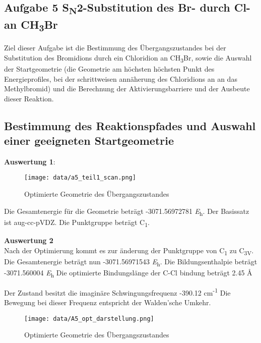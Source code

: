 \documentclass[12pt]{article}
\begin{document}
\begin{onehalfspace}

\raggedright
\section{Aufgabe 5 S\textsubscript{N}2-Substitution des Br- durch Cl- an CH\textsubscript{3}Br}

Ziel dieser Aufgabe ist die Bestimmung des Übergangszustandes bei der
Substitution des Bromidions durch ein Chloridion an CH\textsubscript{3}Br,
sowie die Auswahl der Startgeometrie (die Geometrie am höchsten höchsten Punkt
des Energieprofiles, bei der schrittweisen annäherung des Chloridions an an
das Methylbromid) und die Berechnung der Aktivierungsbarriere und der Ausbeute
dieser Reaktion.


\subsection{Bestimmung des Reaktionspfades und Auswahl einer geeigneten Startgeometrie}



\textbf{Auswertung 1}:

\begin{figure}[!htbp]
\centering
  \texttt{[image: data/a5\_teil1\_scan.png]}%
  \caption{Optimierte Geometrie des Übergangszustandes}
\end{figure}
\noindent

 Die Gesamtenergie für die Geometrie beträgt -3071.56972781 \si{\hartree}.
 Der Basissatz ist aug-cc-pVDZ. Die Punktgruppe beträgt C\textsubscript{1}.

\textbf{Auswertung 2}\\

Nach der Optimierung kommt es zur änderung der Punktgruppe von
C\textsubscript{1} zu C\textsubscript{3V}. Die Gesamtenergie beträgt nun
-3071.56971543 \si{\hartree}. Die Bildungsenthalpie beträgt -3071.560004
\si{\hartree} Die optimierte Bindungslänge der C-Cl bindung beträgt 2.45
\si{\angstrom}

Der Zustand besitzt die imaginäre Schwingungsfrequenz -390.12
cm\textsuperscript{-1} Die Bewegung bei dieser Frequenz entspricht der
Walden'sche Umkehr.

\begin{figure}[!htbp]
\centering
  \texttt{[image: data/A5\_opt\_darstellung.png]}%
  \caption{Optimierte Geometrie des Übergangszustandes}
\end{figure}
\noindent


\end{onehalfspace}
\end{document}
